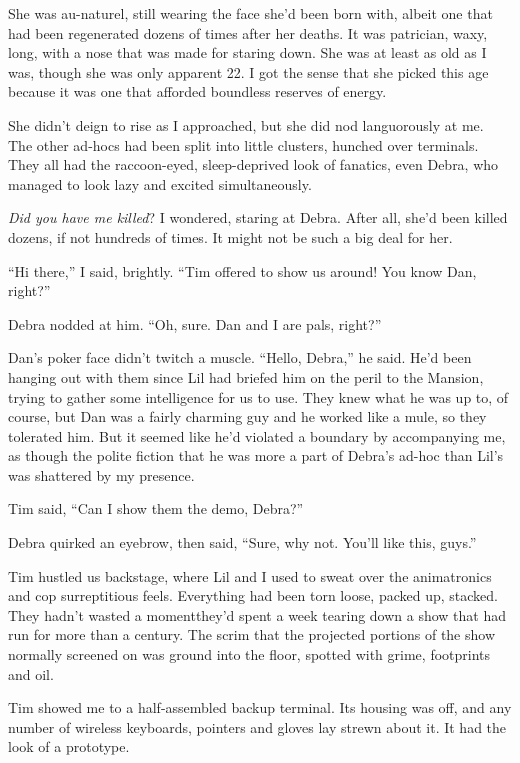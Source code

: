 She was au-naturel, still wearing the face she'd been born with,
albeit one that had been regenerated dozens of times after her
deaths. It was patrician, waxy, long, with a nose that was made for
staring down. She was at least as old as I was, though she was only
apparent 22. I got the sense that she picked this age because it
was one that afforded boundless reserves of energy.

She didn't deign to rise as I approached, but she did nod
languorously at me. The other ad-hocs had been split into little
clusters, hunched over terminals. They all had the raccoon-eyed,
sleep-deprived look of fanatics, even Debra, who managed to look
lazy and excited simultaneously.

\emph{Did you have me killed}? I wondered, staring at Debra. After
all, she'd been killed dozens, if not hundreds of times. It might
not be such a big deal for her.

“Hi there,” I said, brightly. “Tim offered to show us around! You
know Dan, right?”

Debra nodded at him. “Oh, sure. Dan and I are pals, right?”

Dan's poker face didn't twitch a muscle. “Hello, Debra,” he said.
He'd been hanging out with them since Lil had briefed him on the
peril to the Mansion, trying to gather some intelligence for us to
use. They knew what he was up to, of course, but Dan was a fairly
charming guy and he worked like a mule, so they tolerated him. But
it seemed like he'd violated a boundary by accompanying me, as
though the polite fiction that he was more a part of Debra's ad-hoc
than Lil's was shattered by my presence.

Tim said, “Can I show them the demo, Debra?”

Debra quirked an eyebrow, then said, “Sure, why not. You'll like
this, guys.”

Tim hustled us backstage, where Lil and I used to sweat over the
animatronics and cop surreptitious feels. Everything had been torn
loose, packed up, stacked. They hadn't wasted a moment{\dash}they'd spent
a week tearing down a show that had run for more than a century.
The scrim that the projected portions of the show normally screened
on was ground into the floor, spotted with grime, footprints and
oil.

Tim showed me to a half-assembled backup terminal. Its housing was
off, and any number of wireless keyboards, pointers and gloves lay
strewn about it. It had the look of a prototype.

